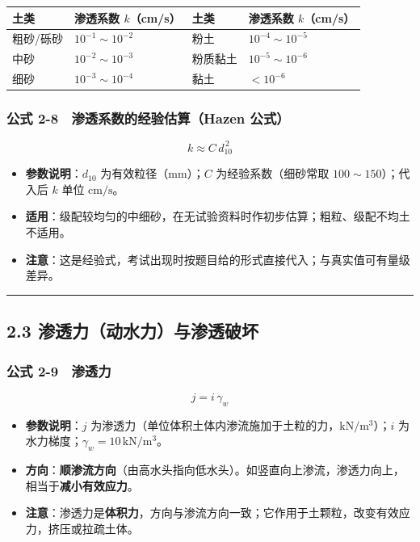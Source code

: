 \documentclass[
]{article}
\newcounter{none} %
\providecommand{\tightlist}{%
  \setlength{\itemsep}{0pt}\setlength{\parskip}{0pt}}
\begin{document}
{\def\LTcaptype{none} %
\begin{longtable}[]{@{}llll@{}}
\toprule\noalign{}
土类 & 渗透系数 \(k\)（cm/s） & 土类 & 渗透系数 \(k\)（cm/s） \\
\midrule\noalign{}
\endhead
\bottomrule\noalign{}
\endlastfoot
粗砂/砾砂 & \(10^{-1}\sim10^{-2}\) & 粉土 & \(10^{-4}\sim10^{-5}\) \\
中砂 & \(10^{-2}\sim10^{-3}\) & 粉质黏土 & \(10^{-5}\sim10^{-6}\) \\
细砂 & \(10^{-3}\sim10^{-4}\) & 黏土 & \(<10^{-6}\) \\
\end{longtable}
}

\subsubsection{公式 2-8　渗透系数的经验估算（Hazen
公式）}\label{ux516cux5f0f-2-8-ux6e17ux900fux7cfbux6570ux7684ux7ecfux9a8cux4f30ux7b97hazen-ux516cux5f0f}

\[k\approx C\,d_{10}^{\,2}\]

\begin{itemize}
\tightlist
\item
  \textbf{参数说明}：\(d_{10}\) 为有效粒径（mm）；\(C\)
  为经验系数（细砂常取 \(100\sim150\)）；代入后 \(k\) 单位
  \(\mathrm{cm/s}\)。
\item
  \textbf{适用}：级配较均匀的中细砂，在无试验资料时作初步估算；粗粒、级配不均土不适用。
\item
  \textbf{注意}：这是经验式，考试出现时按题目给的形式直接代入；与真实值可有量级差异。
\end{itemize}

\begin{center}\rule{0.5\linewidth}{0.5pt}\end{center}

\subsection{2.3
渗透力（动水力）与渗透破坏}\label{ux6e17ux900fux529bux52a8ux6c34ux529bux4e0eux6e17ux900fux7834ux574f}

\subsubsection{公式
2-9　渗透力}\label{ux516cux5f0f-2-9-ux6e17ux900fux529b}

\[j=i\,\gamma_w\]

\begin{itemize}
\tightlist
\item
  \textbf{参数说明}：\(j\)
  为渗透力（单位体积土体内渗流施加于土粒的力，\(\mathrm{kN/m^3}\)）；\(i\)
  为水力梯度；\(\gamma_w=10\,\mathrm{kN/m^3}\)。
\item
  \textbf{方向}：\textbf{顺渗流方向}（由高水头指向低水头）。如竖直向上渗流，渗透力向上，相当于\textbf{减小有效应力}。
\item
  \textbf{注意}：渗透力是\textbf{体积力}，方向与渗流方向一致；它作用于土颗粒，改变有效应力，挤压或拉疏土体。
\end{itemize}
\end{document}
